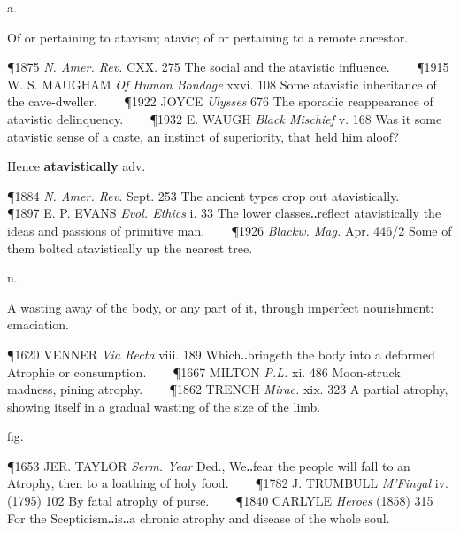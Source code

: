 \begin{description}[wide, labelwidth=!, labelindent=0pt]
 a.

\noindent {}


Of or pertaining to atavism; atavic; of or pertaining to a remote ancestor.

\P 1875 \textit{N. Amer. Rev.} CXX. 275 The social and the atavistic influence.    
\P 1915 W. S. MAUGHAM  \textit{Of Human Bondage} xxvi. 108 Some atavistic inheritance of the cave-dweller.    
\P 1922 JOYCE  \textit{Ulysses} 676 The sporadic reappearance of atavistic delinquency.    
\P 1932 E. WAUGH  \textit{Black Mischief} v. 168 Was it some atavistic sense of a caste, an instinct of superiority, that held him aloof?

Hence \textbf{atavistically} adv.

\P 1884 \textit{N. Amer. Rev.} Sept. 253 The ancient types crop out atavistically.    
\P 1897 E. P. EVANS  \textit{Evol. Ethics} i. 33 The lower classes‥reflect atavistically the ideas and passions of primitive man.    
\P 1926 \textit{Blackw. Mag.} Apr. 446/2 Some of them bolted atavistically up the nearest tree.


 n.

\noindent {}

\vspace{-0.3cm}

\begin{myenumerate}

 A wasting away of the body, or any part of it, through imperfect nourishment: emaciation.

\P 1620 VENNER  \textit{Via Recta} viii. 189 Which‥bringeth the body into a deformed Atrophie or consumption.    
\P 1667 MILTON  \textit{P.L.} xi. 486 Moon-struck madness, pining atrophy.    
\P 1862 TRENCH  \textit{Mirac.} xix. 323 A partial atrophy, showing itself in a gradual wasting of the size of the limb.

 fig.

\P 1653 JER. TAYLOR  \textit{Serm. Year} Ded., We‥fear the people will fall to an Atrophy, then to a loathing of holy food.    
\P 1782 J. TRUMBULL  \textit{M'Fingal} iv. (1795) 102 By fatal atrophy of purse.    
\P 1840 CARLYLE  \textit{Heroes} (1858) 315 For the Scepticism‥is‥a chronic atrophy and disease of the whole soul.
\end{myenumerate}


\end{description}
